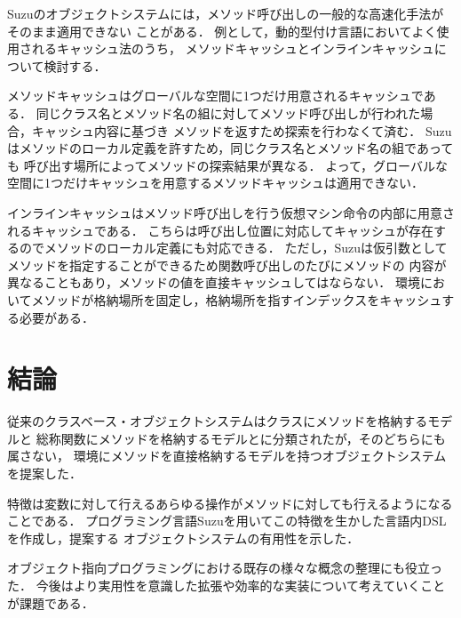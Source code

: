 \documentclass{ipsjprosym}
\begin{document}
Suzuのオブジェクトシステムには，メソッド呼び出しの一般的な高速化手法がそのまま適用できない
ことがある．
例として，動的型付け言語においてよく使用されるキャッシュ法\cite{Onodera:1997-04-15}のうち，
メソッドキャッシュとインラインキャッシュについて検討する．

メソッドキャッシュはグローバルな空間に1つだけ用意されるキャッシュである．
同じクラス名とメソッド名の組に対してメソッド呼び出しが行われた場合，キャッシュ内容に基づき
メソッドを返すため探索を行わなくて済む．
Suzuはメソッドのローカル定義を許すため，同じクラス名とメソッド名の組であっても
呼び出す場所によってメソッドの探索結果が異なる．
よって，グローバルな空間に1つだけキャッシュを用意するメソッドキャッシュは適用できない．

インラインキャッシュはメソッド呼び出しを行う仮想マシン命令の内部に用意されるキャッシュである．
こちらは呼び出し位置に対応してキャッシュが存在するのでメソッドのローカル定義にも対応できる．
ただし，Suzuは仮引数としてメソッドを指定することができるため関数呼び出しのたびにメソッドの
内容が異なることもあり，メソッドの値を直接キャッシュしてはならない．
環境においてメソッドが格納場所を固定し，格納場所を指すインデックスをキャッシュする必要がある．

\section{結論}

従来のクラスベース・オブジェクトシステムはクラスにメソッドを格納するモデルと
総称関数にメソッドを格納するモデルとに分類されたが，そのどちらにも属さない，
環境にメソッドを直接格納するモデルを持つオブジェクトシステムを提案した．

特徴は変数に対して行えるあらゆる操作がメソッドに対しても行えるようになることである．
プログラミング言語Suzuを用いてこの特徴を生かした言語内DSLを作成し，提案する
オブジェクトシステムの有用性を示した．

オブジェクト指向プログラミングにおける既存の様々な概念の整理にも役立った．
今後はより実用性を意識した拡張や効率的な実装について考えていくことが課題である．





\end{document}
